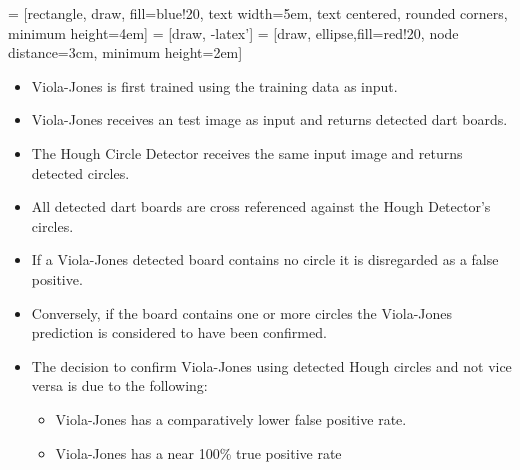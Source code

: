 \documentclass[conference]{IEEEtran}
\begin{document}
 = [rectangle, draw, fill=blue!20, text width=5em, text centered, rounded corners, minimum height=4em]
 = [draw, -latex']
 = [draw, ellipse,fill=red!20, node distance=3cm,
minimum height=2em]


\begin{itemize}
	\item Viola-Jones is first trained using the training data as input.
	\item Viola-Jones receives an test image as input and returns detected dart boards.
	\item The Hough Circle Detector receives the same input image and returns detected circles.
	\item All detected dart boards are cross referenced against the Hough Detector's circles.
	\item If a Viola-Jones detected board contains no circle it is disregarded as a false positive.
	\item Conversely, if the board contains one or more circles the Viola-Jones prediction is considered to have been confirmed.
	\item The decision to confirm Viola-Jones using detected Hough circles and not vice versa is due to the following: 
	\begin{itemize}
		\item Viola-Jones has a comparatively lower false positive rate.
		\item Viola-Jones has a near 100\% true positive rate
	\end{itemize}
\end{itemize}
\end{document}
